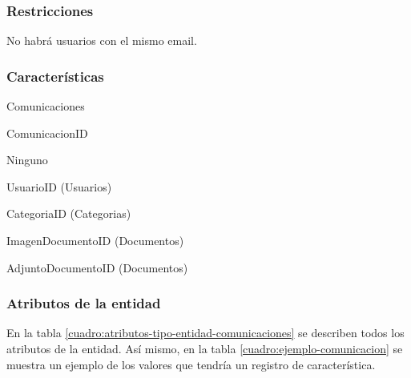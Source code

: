 \subsubsection*{Restricciones}
No habrá usuarios con el mismo email.

\subsubsection*{Características}
\begin{description}[nosep,style=multiline,labelindent=0.8cm,leftmargin=4.5cm,font=\normalfont]
    \item[Nombre] Comunicaciones
    \item[Id. principal] ComunicacionID
    \item[Id. alternativo] Ninguno
    \item[Atrib. heredados] 
        UsuarioID (Usuarios)

        CategoriaID (Categorias)

        ImagenDocumentoID (Documentos)

        AdjuntoDocumentoID (Documentos)
\end{description}

\subsubsection*{Atributos de la entidad}
En la tabla \ref{cuadro:atributos-tipo-entidad-comunicaciones} se describen todos los atributos de la entidad. Así mismo, en la tabla \ref{cuadro:ejemplo-comunicacion} se muestra un ejemplo de los valores que tendría un registro de característica.

